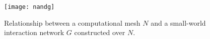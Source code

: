 \begin{figure}[t]
\begin{center}
\texttt{[image: nandg]}
\caption{
Relationship between a computational mesh $N$ and a small-world interaction network $G$ constructed over $N$.
}
\label{fig:nandg}
\end{center}
\end{figure}
